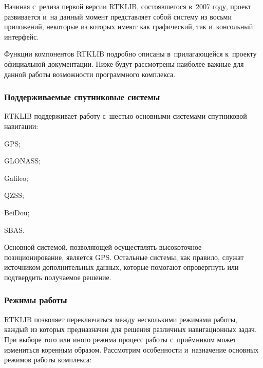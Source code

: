 Начиная с~релиза первой версии RTKLIB, состоявшегося в~2007 году, проект развивается и~на данный момент представляет собой систему из восьми приложений, некоторые из которых имеют как графический, так и~консольный интерфейс.

Функции компонентов RTKLIB подробно описаны в~прилагающейся к~проекту официальной документации. Ниже будут рассмотрены наиболее важные для данной работы возможности программного комплекса.

\subsubsection{Поддерживаемые спутниковые системы}
\label{subsec:rtklib-supported-gnss}

RTKLIB поддерживает работу с~шестью основными системами спутниковой навигации:

\begin{dashitemize}
  \item GPS;
  \item GLONASS;
  \item Galileo;
  \item QZSS;
  \item BeiDou;
  \item SBAS.
\end{dashitemize}

Основной системой, позволяющей осуществлять высокоточное позиционирование, является GPS. Остальные системы, как правило, служат источником дополнительных данных, которые помогают опровергнуть или подтвердить получаемое решение.

\subsubsection{Режимы работы}
\label{subsec:rtklib-modes}

RTKLIB позволяет переключаться между несколькими режимами работы, каждый из которых предназначен для решения различных навигационных задач. При выборе того или иного режима процесс работы с~приёмником может измениться коренным образом. Рассмотрим особенности и~назначение основных режимов работы комплекса:

